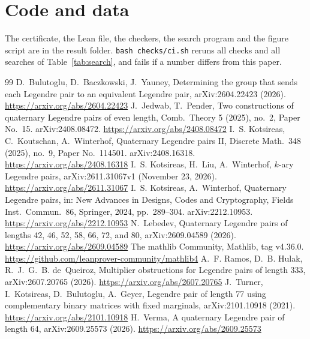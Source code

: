 \documentclass[11pt]{article}
\theoremstyle{remark}
\begin{document}
\section*{Code and data}
The certificate, the Lean file, the checkers, the search program and the figure script are in the result folder. \texttt{bash checks/ci.sh} reruns all checks and all searches of Table~\ref{tab:search}, and fails if a number differs from this paper.

\begin{thebibliography}{99}
 D.~Bulutoglu, D.~Baczkowski, J.~Yauney, Determining the group that sends each Legendre pair to an equivalent Legendre pair, arXiv:2604.22423 (2026). \url{https://arxiv.org/abs/2604.22423}
 J.~Jedwab, T.~Pender, Two constructions of quaternary Legendre pairs of even length, Comb.\ Theory 5 (2025), no.~2, Paper No.~15. arXiv:2408.08472. \url{https://arxiv.org/abs/2408.08472}
 I.~S. Kotsireas, C.~Koutschan, A.~Winterhof, Quaternary Legendre pairs II, Discrete Math.\ 348 (2025), no.~9, Paper No.~114501. arXiv:2408.16318. \url{https://arxiv.org/abs/2408.16318}
 I.~S. Kotsireas, H.~Liu, A.~Winterhof, $k$-ary Legendre pairs, arXiv:2611.31067v1 (November 23, 2026). \url{https://arxiv.org/abs/2611.31067}
 I.~S. Kotsireas, A.~Winterhof, Quaternary Legendre pairs, in: New Advances in Designs, Codes and Cryptography, Fields Inst.\ Commun.\ 86, Springer, 2024, pp.~289--304. arXiv:2212.10953. \url{https://arxiv.org/abs/2212.10953}
 N.~Lebedev, Quaternary Legendre pairs of lengths 42, 46, 52, 58, 66, 72, and 80, arXiv:2609.04589 (2026). \url{https://arxiv.org/abs/2609.04589}
 The mathlib Community, Mathlib, tag v4.36.0. \url{https://github.com/leanprover-community/mathlib4}
 A.~F. Ramos, D.~B. Hulak, R.~J.~G.~B. de~Queiroz, Multiplier obstructions for Legendre pairs of length 333, arXiv:2607.20765 (2026). \url{https://arxiv.org/abs/2607.20765}
 J.~Turner, I.~Kotsireas, D.~Bulutoglu, A.~Geyer, Legendre pair of length 77 using complementary binary matrices with fixed marginals, arXiv:2101.10918 (2021). \url{https://arxiv.org/abs/2101.10918}
 H.~Verma, A quaternary Legendre pair of length 64, arXiv:2609.25573 (2026). \url{https://arxiv.org/abs/2609.25573}
\end{thebibliography}
\end{document}
